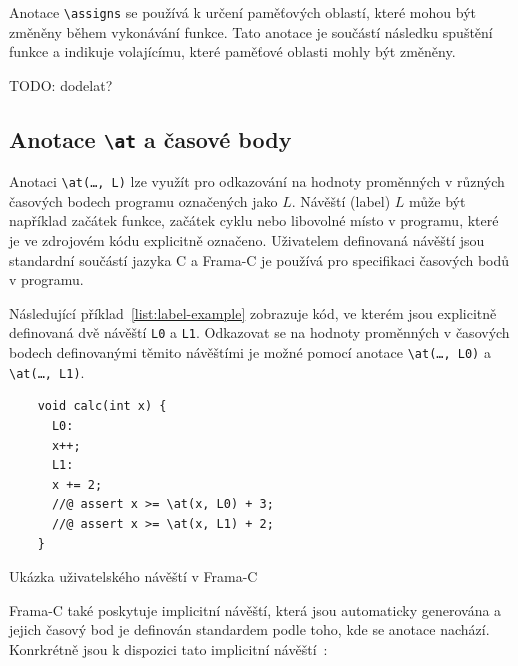 Anotace \texttt{\textbackslash assigns} se používá k určení paměťových oblastí,
které mohou být změněny během vykonávání funkce.
Tato anotace je součástí následku spuštění funkce
a indikuje volajícímu, které paměťové oblasti mohly být změněny.

TODO: dodelat?


\subsection{Anotace \texttt{\textbackslash at} a časové body}
\label{subsec:acsl-anotace-at-a-casove-body}


Anotaci \texttt{\textbackslash at(\dots, L)} lze využít pro odkazování na hodnoty proměnných
v různých časových bodech programu označených jako $L$.
Návěští (label) $L$ může být například začátek funkce, začátek cyklu nebo libovolné místo v programu,
které je ve zdrojovém kódu explicitně označeno.
Uživatelem definovaná návěští jsou standardní součástí jazyka C
a Frama\mbox{-}C je používá pro specifikaci časových bodů v programu.

Následující příklad~\ref{list:label-example} zobrazuje kód,
ve kterém jsou explicitně definovaná dvě návěští \texttt{L0} a \texttt{L1}.
Odkazovat se na hodnoty proměnných v časových bodech definovanými těmito návěštími
je možné pomocí anotace \texttt{\textbackslash at(\dots, L0)} a \texttt{\textbackslash at(\dots, L1)}.

\begin{listing}[H]
    \begin{verbatim}
    void calc(int x) {
      L0:
      x++;
      L1:
      x += 2;
      //@ assert x >= \at(x, L0) + 3;
      //@ assert x >= \at(x, L1) + 2;
    }
    \end{verbatim}
    \caption{Ukázka uživatelského návěští v Frama-C}
    \label{list:label-example}
\end{listing}

Frama\mbox{-}C také poskytuje implicitní návěští,
která jsou automaticky generována a jejich časový bod je definován
standardem podle toho, kde se anotace nachází.
Konrkrétně jsou k dispozici tato implicitní návěští~\cite{ACSLSpec}:

